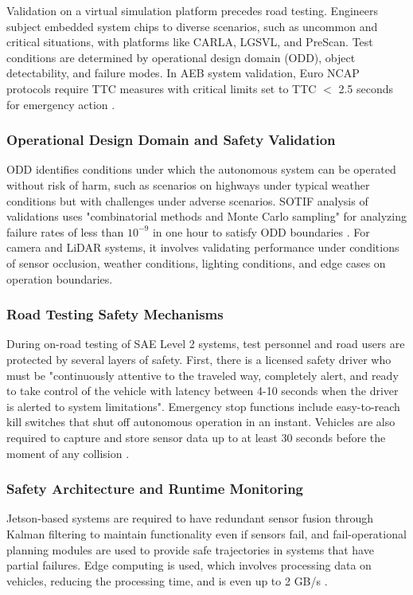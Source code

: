 \documentclass[12pt, a4paper]{report}
\begin{document}
Validation on a virtual simulation platform precedes road testing. Engineers subject embedded system chips to diverse scenarios, such as uncommon and critical situations, with platforms like CARLA, LGSVL, and PreScan. Test conditions are determined by operational design domain (ODD), object detectability, and failure modes. In AEB system validation, Euro NCAP protocols require TTC measures with critical limits set to TTC $<$ 2.5 seconds for emergency action \cite{ref28}.

\subsubsection{Operational Design Domain and Safety Validation}

ODD identifies conditions under which the autonomous system can be operated without risk of harm, such as scenarios on highways under typical weather conditions but with challenges under adverse scenarios. SOTIF analysis of validations uses "combinatorial methods and Monte Carlo sampling" for analyzing failure rates of less than $10^{-9}$ in one hour to satisfy ODD boundaries \cite{ref29}. For camera and LiDAR systems, it involves validating performance under conditions of sensor occlusion, weather conditions, lighting conditions, and edge cases on operation boundaries.

\subsubsection{Road Testing Safety Mechanisms}

During on-road testing of SAE Level 2 systems, test personnel and road users are protected by several layers of safety. First, there is a licensed safety driver who must be "continuously attentive to the traveled way, completely alert, and ready to take control of the vehicle with latency between 4-10 seconds when the driver is alerted to system limitations". Emergency stop functions include easy-to-reach kill switches that shut off autonomous operation in an instant. Vehicles are also required to capture and store sensor data up to at least 30 seconds before the moment of any collision \cite{ref30}.

\subsubsection{Safety Architecture and Runtime Monitoring}

Jetson-based systems are required to have redundant sensor fusion through Kalman filtering to maintain functionality even if sensors fail, and fail-operational planning modules are used to provide safe trajectories in systems that have partial failures. Edge computing is used, which involves processing data on vehicles, reducing the processing time, and is even up to 2 GB/s \cite{ref25}.
\end{document}
